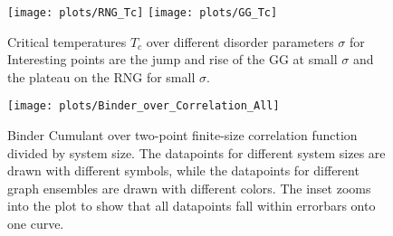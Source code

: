 \begin{figure}[hbtp]
    \centering
    \texttt{[image: plots/RNG\_Tc]}
    \texttt{[image: plots/GG\_Tc]}
    \caption[Critical Temperature over Different Disorder Parameters]
    {
        Critical temperatures \(T_c\) over different
        disorder parameters \(\sigma\) for
        Interesting points are the jump and rise of the GG at small
        \(\sigma\) and the plateau on the RNG for small \(\sigma\).
    }
    \label{fig:Tc}
\end{figure}

\begin{figure*}[hbtp]
    \centering
    \texttt{[image: plots/Binder\_over\_Correlation\_All]}
    \caption[Binder Cumulant over two-point finite-size correlation function divided by system size]
    {
        Binder Cumulant over two-point finite-size correlation function
        divided by system size. The datapoints for different system sizes
        are drawn with different symbols, while the datapoints for different
        graph ensembles are drawn with different colors.
        The inset zooms into the plot to show that
        all datapoints fall within errorbars onto one curve.
    }
    \label{fig:binderOverCorr}
\end{figure*}
